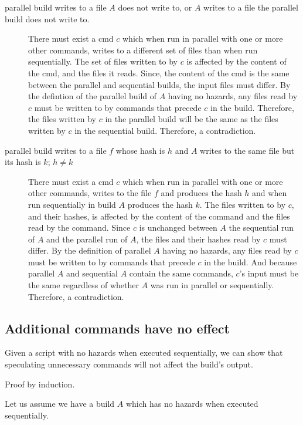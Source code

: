 \begin{description}
\item [parallel build writes to a file $A$ does not write to, or $A$ writes to a file the parallel build does not write to.]
  There must exist a cmd $c$ which when run in parallel with one or more other commands, writes to a different set of files than when run sequentially.  The set of files written to by $c$ is affected by the content of the cmd, and the files it reads.  Since, the content of the cmd is the same between the parallel and sequential builds, the input files must differ.
  By the defintion of the parallel build of $A$ having no hazards, any files read by $c$ must be written to by commands that precede $c$ in the build.  Therefore, the files written by $c$ in the parallel build will be the same as the files written by $c$ in the sequential build.  Therefore, a contradiction.


\item [parallel build writes to a file $f$ whose hash is $h$ and $A$ writes to the same file but its hash is $k$; $h \neq k$]
  There must exist a cmd $c$ which when run in parallel with one or more other commands, writes to the file $f$ and produces the hash $h$ and when run sequentially in build $A$ produces the hash $k$.
  The files written to by $c$, and their hashes, is affected by the content of the command and the files read by the command.  Since $c$ is unchanged between $A$ the sequential run of $A$ and the parallel run of $A$, the files and their hashes read by $c$ must differ.  By the definition of parallel $A$ having no hazards, any files read by $c$ must be written to by commands that precede $c$ in the build.  And because parallel $A$ and sequential $A$ contain the same commands, $c$'s input must be the same regardless of whether $A$ was run in parallel or sequentially.  Therefore, a contradiction.

\end{description}

\subsection{Additional commands have no effect}
\label{sec:proof:additional}

Given a script with no hazards when executed sequentially, we can show that speculating unnecessary commands will not affect the build's output. %

Proof by induction.

Let us assume we have a build $A$ which has no hazards when executed sequentially.

